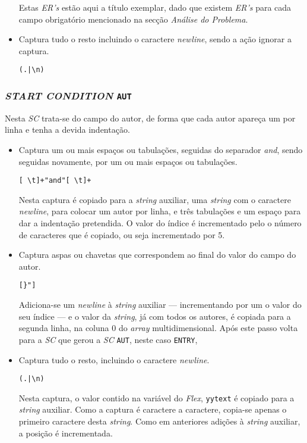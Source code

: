 \begin{itemize}
Estas \emph{ER's} estão aqui a título exemplar, dado que existem \emph{ER's}
para cada campo obrigatório mencionado na secção \emph{Análise do Problema}.


\item Captura tudo o resto incluindo o caractere \emph{newline}, sendo a ação
	ignorar a captura.
\begin{verbatim}
(.|\n)
\end{verbatim}



\end{itemize}


\subsubsection{\emph{START CONDITION} \texttt{AUT}}
Nesta \emph{SC} trata-se do campo do autor, de forma que cada autor apareça um
por linha e tenha a devida indentação.
\begin{itemize}
\item Captura um ou mais espaços ou tabulações, seguidas do separador
	\emph{and}, sendo seguidas novamente, por um ou mais espaços ou tabulações.
\begin{verbatim}
[ \t]+"and"[ \t]+
\end{verbatim}

Nesta captura é copiado para a \emph{string} auxiliar, uma \emph{string} com
o caractere \emph{newline}, para colocar um autor por linha, e três tabulações
e um espaço para dar a indentação pretendida. O valor do índice é incrementado
pelo o número de caracteres que é copiado, ou seja incrementado por 5.


\item Captura aspas ou chavetas que correspondem ao final do valor do campo do
	autor.
\begin{verbatim}
[}"] 
\end{verbatim}

Adiciona-se um \emph{newline} à \emph{string} auxiliar --- incrementando por um
o valor do seu índice --- e o valor da \emph{string}, já com todos os autores,
é copiada para a segunda linha, na coluna $0$ do \emph{array}
multidimensional. Após este passo volta para a \emph{SC} que gerou a \emph{SC}
\texttt{AUT}, neste caso \texttt{ENTRY}, 

\item Captura tudo o resto, incluindo o caractere \emph{newline}.
\begin{verbatim}
(.|\n)
\end{verbatim}

Nesta captura, o valor contido na variável do \emph{Flex}, \texttt{yytext}
é copiado para a \emph{string} auxiliar. Como a captura é caractere a caractere,
copia-se apenas o primeiro caractere desta \emph{string}. Como em anteriores
adições à \emph{string} auxiliar, a posição é incrementada.


\end{itemize}

